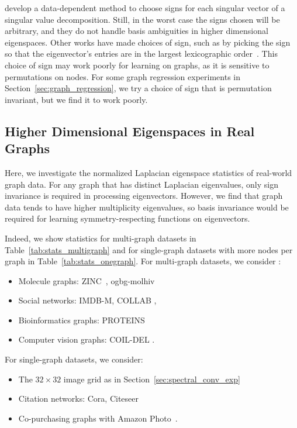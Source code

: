\documentclass{article} \usepackage{iclr2023_conference,times}
\begin{document}
\cite{bro2008resolving} develop a data-dependent method to choose signs for each singular vector of a singular value decomposition. Still, in the worst case the signs chosen will be arbitrary, and they do not handle basis ambiguities in higher dimensional eigenspaces. Other works have made choices of sign, such as by picking the sign so that the eigenvector's entries are in the largest lexicographic order~\citep{tam2022multiscale}. This choice of sign may work poorly for learning on graphs, as it is sensitive to permutations on nodes. For some graph regression experiments in Section~\ref{sec:graph_regression}, we try a choice of sign that is permutation invariant, but we find it to work poorly.


\subsection{Higher Dimensional Eigenspaces in Real Graphs}\label{appendix:higher_dim}

Here, we investigate the normalized Laplacian eigenspace statistics of real-world graph data. For any graph that has distinct Laplacian eigenvalues, only sign invariance is required in processing eigenvectors. However, we find that graph data tends to have higher multiplicity eigenvalues, so basis invariance would be required for learning symmetry-respecting functions on eigenvectors.

Indeed, we show statistics for multi-graph datasets in Table~\ref{tab:stats_multigraph} and for single-graph datasets with more nodes per graph in Table~\ref{tab:stats_onegraph}. For multi-graph datasets, we consider :
\begin{itemize}
    \item Molecule graphs: ZINC~\citep{irwin2012zinc,dwivedi2020benchmarking}, ogbg-molhiv~\citep{wu2018moleculenet,hu2020open}
    \item Social networks: IMDB-M, COLLAB \citep{yanardag2015deep,morris2020tudataset}, 
    \item Bioinformatics graphs: PROTEINS \citep{morris2020tudataset}
    \item Computer vision graphs: COIL-DEL \citep{riesen2008iam,morris2020tudataset}.
\end{itemize}
For single-graph datasets, we consider: 
\begin{itemize}
    \item  The $32 \times 32$ image grid as in Section~\ref{sec:spectral_conv_exp}
    \item Citation networks: Cora, Citeseer~\citep{sen2008collective}
    \item Co-purchasing graphs with Amazon Photo~\citep{mcauley2015image,shchur2018pitfalls}.
\end{itemize}
\end{document}
